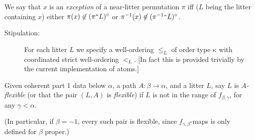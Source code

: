\begin{definition}
\label{def:perm-exception}
\leanok
{}
We say that $x$ is an {\em exception} of a near-litter permutation $\pi$ iff ($L$ being the litter containing $x$) either $\pi(x) \not\in (\pi``L)^\circ$ or $\pi^{-1}(x) \not\in ({\pi^{-1}}``L)^\circ$.
\end{definition}

\begin{description}
\item[Stipulation:]  For each litter $L$ we specify a well-ordering $\leq_L$ of order type $\kappa$ with coordinated strict well-ordering $<_L$.  [In fact this is provided trivially by the current implementation of atoms.]
\end{description}

\begin{definition}
  \label{def:flexible}
  Given coherent part 1 data below $\alpha$, a path $A : \beta \to \alpha$, and a litter $L$, say $L$ is \emph{$A$-flexible} (or that the pair $(L,A)$ is \emph{flexible}) if $L$ is not in the range of $f_{\beta,\gamma}$, for any $\gamma < \alpha$.

  (In particular, if $\beta = -1$, every such pair is flexible, since $f_{\gamma,\beta}$-maps is only defined for $\beta$ proper.)
\end{definition}

